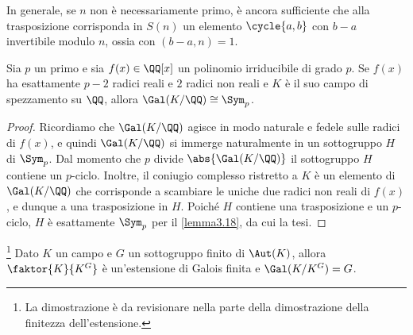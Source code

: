 \documentclass[11pt]{scrartcl}
\begin{document}
	\begin{remark}
		In generale, se $n$ non è necessariamente primo, è ancora sufficiente che alla trasposizione
		corrisponda in $S(n)$ un elemento $\cycle{a, b}$ con $b-a$ invertibile modulo $n$, ossia
		con $(b-a, n) = 1$. 
	\end{remark}
	
	\begin{lemma}
		\label{lemma3.19}
		Sia $p$ un primo e sia $f(x) \in \QQ[x]$ un polinomio irriducibile di grado
		$p$. Se $f(x)$ ha esattamente $p - 2$ radici reali e $2$ radici non reali
		e $K$ è il suo campo di spezzamento su $\QQ$, allora $\Gal(K/\QQ) \cong \Sym_p$.
	\end{lemma}
	
	\begin{proof}
		Ricordiamo che $\Gal(K/\QQ)$ agisce in modo naturale e fedele sulle radici di
		$f(x)$, e quindi $\Gal(K/\QQ)$ si immerge naturalmente in un sottogruppo
		$H$ di
		$\Sym_p$. Dal momento che $p$ divide $\abs{\Gal(K/\QQ)}$ il sottogruppo $H$
		contiene
		un $p$-ciclo. Inoltre, il coniugio complesso ristretto a $K$ è
		un elemento di $\Gal(K/\QQ)$ che corrisponde a scambiare le uniche due
		radici non reali di $f(x)$, e dunque a una trasposizione in $H$. Poiché
		$H$ contiene una trasposizione e un $p$-ciclo,
		$H$ è esattamente $\Sym_p$ per il \autoref{lemma3.18}, da cui la tesi.
	\end{proof}
	
	\begin{lemma}
		\footnote{
			La dimostrazione è da revisionare nella parte della dimostrazione 
			della finitezza dell'estensione.
		}
		\label{lemma3.20}
		Dato $K$ un campo e $G$ un sottogruppo finito di $\Aut(K)$, allora 
		$\faktor{K}{K^G}$ è un'estensione di Galois finita e $\Gal(K/K^G) = G$.
	\end{lemma}
	
\end{document}
